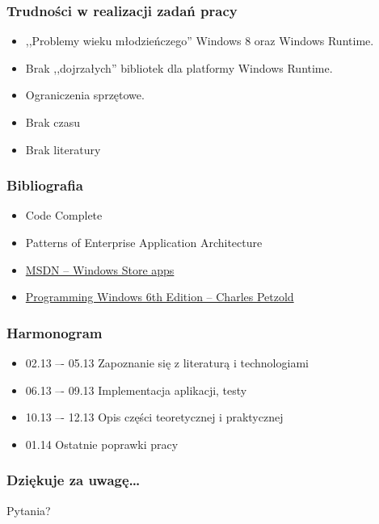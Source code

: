 \documentclass{beamer}
\begin{document}
\begin{frame}
\frametitle{Trudności w realizacji zadań pracy}

\begin{itemize}
\item ,,Problemy wieku młodzieńczego'' Windows 8 oraz Windows Runtime.
\item Brak ,,dojrzałych'' bibliotek dla platformy Windows Runtime.
\item Ograniczenia sprzętowe.
\item Brak czasu
\item Brak literatury
\end{itemize}
\end{frame}


\begin{frame}
\frametitle{Bibliografia} 
\begin{itemize}
\item Code Complete 
\item Patterns of Enterprise Application Architecture
\item \href{http://msdn.microsoft.com/en-us/windows/apps/}{MSDN -- Windows Store apps}
\item \href{http://www.charlespetzold.com/blog/2013/01/Programming-Windows-6th-Edition-Final-Ebook-Now-Available.html}{Programming Windows 6th Edition -- Charles Petzold}
\end{itemize}
\end{frame}


\begin{frame}
\frametitle{Harmonogram} 
\begin{itemize}

\item 02.13 –- 05.13 Zapoznanie się z literaturą i technologiami
\item 06.13 –- 09.13 Implementacja aplikacji, testy
\item 10.13 –- 12.13 Opis części teoretycznej i praktycznej
\item 01.14 Ostatnie poprawki pracy

\end{itemize}
\end{frame}


\begin{frame}
\frametitle{Dziękuje za uwagę\dots}
Pytania?
\end{frame}
\end{document}
